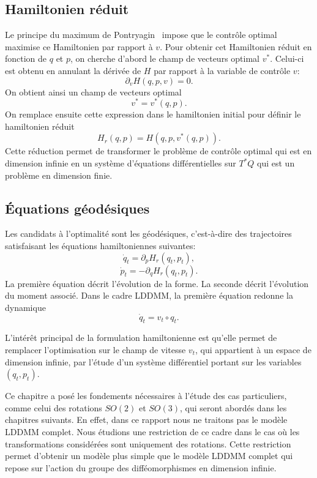 \documentclass[12pt]{report}
\begin{document}
\subsection{Hamiltonien réduit}
Le principe du maximum de Pontryagin~\cite{Zib21} impose que le contrôle optimal maximise ce Hamiltonien par rapport à $v$. Pour obtenir cet Hamiltonien réduit en fonction de $q$ et $p$, on cherche d'abord le champ de vecteurs optimal $v^*$. Celui-ci est obtenu en annulant la dérivée de $H$ par rapport à la variable de contrôle $v$:
\[
\partial_v H(q,p,v)=0.
\]
On obtient ainsi un champ de vecteurs optimal
\[
v^*=v^*(q,p).
\]
On remplace ensuite cette expression dans le hamiltonien initial pour définir le hamiltonien réduit
\[
H_r(q,p)=H(q,p,v^*(q,p)).
\]
Cette réduction permet de transformer le problème de contrôle optimal qui est en dimension infinie en un système d'équations différentielles sur $T^*Q$ qui est un problème en dimension finie.

\subsection{Équations géodésiques}
Les candidats à l'optimalité sont les géodésiques, c'est-à-dire des trajectoires satisfaisant les équations hamiltoniennes suivantes:
\[
\dot q_t = \partial_p H_r(q_t,p_t),
\]
\[
\dot p_t = -\partial_q H_r(q_t,p_t).
\]
La première équation décrit l'évolution de la forme. La seconde décrit l'évolution du moment associé. Dans le cadre LDDMM, la première équation redonne la dynamique
\[
\dot q_t = v_t\circ q_t.
\]

\begin{remark}
L'intérêt principal de la formulation hamiltonienne est qu'elle permet de remplacer l'optimisation sur le champ de vitesse $v_t$, qui appartient à un espace de dimension infinie, par l'étude d'un système différentiel portant sur les variables $(q_t,p_t)$.
\end{remark}

Ce chapitre a posé les fondements nécessaires à l'étude des cas particuliers, comme celui des rotations $SO(2)$ et $SO(3)$, qui seront abordés dans les chapitres suivants. En effet, dans ce rapport nous ne traitons pas le modèle LDDMM complet. Nous étudions une restriction de ce cadre dans le cas où les transformations considérées sont uniquement des rotations. Cette restriction permet d'obtenir un modèle plus simple que le modèle LDDMM complet qui repose sur l'action du groupe des difféomorphismes en dimension infinie.
\end{document}
